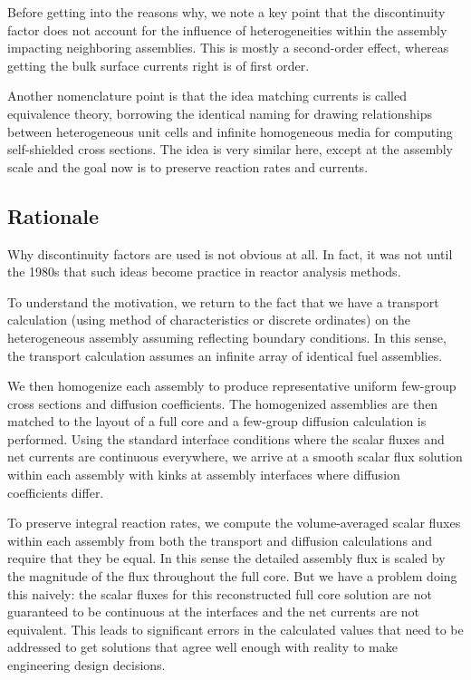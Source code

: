 Before getting into the reasons why, we note a key point that the discontinuity factor does not account for the influence of heterogeneities within the assembly impacting neighboring assemblies. This is mostly a second-order effect, whereas getting the bulk surface currents right is of first order.

Another nomenclature point is that the idea matching currents is called equivalence theory, borrowing the identical naming for drawing relationships between heterogeneous unit cells and infinite homogeneous media for computing self-shielded cross sections. The idea is very similar here, except at the assembly scale and the goal now is to preserve reaction rates and currents.



\subsection{Rationale}

Why discontinuity factors are used is not obvious at all. In fact, it was not until the 1980s that such ideas become practice in reactor analysis methods.

To understand the motivation, we return to the fact that we have a transport calculation (using method of characteristics or discrete ordinates) on the heterogeneous assembly assuming reflecting boundary conditions. In this sense, the transport calculation assumes an infinite array of identical fuel assemblies.

We then homogenize each assembly to produce representative uniform few-group cross sections and diffusion coefficients. The homogenized assemblies are then matched to the layout of a full core and a few-group diffusion calculation is performed. Using the standard interface conditions where the scalar fluxes and net currents are continuous everywhere, we arrive at a smooth scalar flux solution within each assembly with kinks at assembly interfaces where diffusion coefficients differ.

To preserve integral reaction rates, we compute the volume-averaged scalar fluxes within each assembly from both the transport and diffusion calculations and require that they be equal. In this sense the detailed assembly flux is scaled by the magnitude of the flux throughout the full core. But we have a problem doing this naively: the scalar fluxes for this reconstructed full core solution are not guaranteed to be continuous at the interfaces and the net currents are not equivalent. This leads to significant errors in the calculated values that need to be addressed to get solutions that agree well enough with reality to make engineering design decisions.


